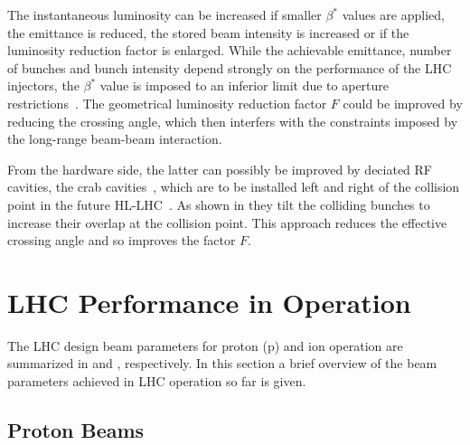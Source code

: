 

%
The instantaneous luminosity can be increased if smaller $\beta^*$ values are applied, the emittance is reduced, the stored beam intensity is increased or if the luminosity reduction factor is enlarged. While the achievable emittance, number of bunches and bunch intensity depend strongly on the performance of the LHC injectors, the $\beta^*$ value is imposed to an inferior limit due to aperture restrictions~\cite{PhysRevSTAB.18.061001}. The geometrical luminosity reduction factor $F$ could be improved by reducing the crossing angle, which then interfers with the constraints imposed by the long-range beam-beam interaction.
%

From the hardware side, the latter can possibly be improved by deciated RF cavities, the crab cavities~\cite{}, which are to be installed left and right of the collision point in the future HL-LHC~\cite{}. As shown in  they tilt the colliding bunches to increase their overlap at the collision point. This approach reduces the effective crossing angle and so improves the factor $F$. 
 






\section{LHC Performance in Operation} \label{chap:lhccycle}
%
 
The LHC design beam parameters for proton (p) and \lead ion operation are summarized in  and , respectively. In this section a brief overview of the beam parameters achieved in LHC operation so far is given.

\subsection{Proton Beams}

